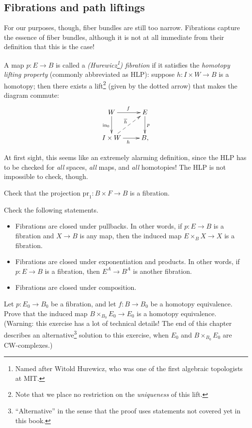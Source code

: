 \subsection{Fibrations and path liftings}
For our purposes, though, fiber bundles are still too narrow.
Fibrations capture the essence of fiber bundles, although it is not at all immediate from their definition that this is the case!
\begin{definition}\label{fibration}
    A map $p:E\to B$ is called a \emph{(Hurewicz\footnote{Named after Witold Hurewicz, who was one of the first algebraic
    topologists at MIT.}) fibration} if it satisfies the
    \emph{homotopy lifting property} (commonly abbreviated as HLP):
    suppose $h:I\times W\to B$ is a homotopy; then there exists a lift\footnote{Note that we place no restriction on the
    \emph{uniqueness} of this lift.}
    (given by the dotted arrow) that makes the diagram commute:
    \begin{equation}\label{hlp}
	\xymatrix{
	    W\ar[r]^f\ar[d]_{\mathrm{in}_0} & E\ar[d]^p\\
	    I\times W\ar[r]_h\ar@{-->}[ur]^{\overline{h}} & B,
	    }
    \end{equation}
\end{definition}
At first sight, this seems like an extremely alarming definition, since
the HLP has to be checked for \emph{all} spaces, \emph{all} maps, and \emph{all} homotopies! 
The HLP is not impossible to check, though.

\begin{exercise}\label{productfibration}
    Check that the projection $\mathrm{pr}_1: B\times F\to B$ is a fibration.
\end{exercise}

\begin{exercise}
    Check the following statements.
    \begin{itemize}
	\item Fibrations are closed under pullbacks. In other words, if $p:E\to B$ is a fibration and $X\to B$ is any map, then the induced map $E\times_B X\to X$ is a fibration.
	\item Fibrations are closed under exponentiation and products. In other words, if $p:E\to B$ is a fibration, then $E^A\to B^A$ is another fibration.
	\item Fibrations are closed under composition.
    \end{itemize}
\end{exercise}

\begin{exercise}
    Let $p:E_0 \to B_0$ be a fibration, and let $f:B \to B_0$ be a homotopy equivalence.
    Prove that the induced map $B\times_{B_0} E_0 \to E_0$ is a homotopy equivalence.
    (Warning: this exercise has a lot of technical details! The end of this chapter describes an
    alternative\footnote{``Alternative'' in the sense that the proof uses statements
    not covered yet in this book.}
    solution to this exercise, when $E_0$ and $B\times_{B_0} E_0$ are CW-complexes.)
\end{exercise}


